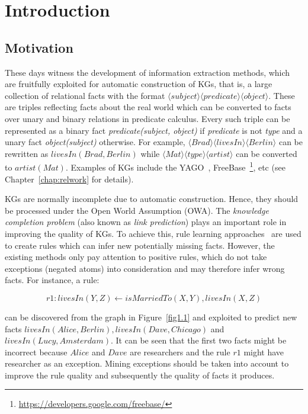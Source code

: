 \chapter{Introduction}
\label{chap:intro}

\section{Motivation}
\label{chap:motivation}

These days witness the development of information extraction methods, which are fruitfully exploited for automatic construction of KGs, that is, a large collection of relational facts with the format $\langle subject \rangle \langle predicate \rangle \langle object \rangle$. These are triples reflecting facts about the real world which can be converted to facts over unary and binary relations in predicate calculus. Every such triple can be represented as a binary fact \textit{predicate(subject, object)} if \textit{predicate} is not \textit{type} and a unary fact \textit{object(subject)} otherwise. For example, $\langle Brad \rangle \langle livesIn \rangle \langle Berlin \rangle$ can be rewritten as $livesIn(Brad, Berlin)$ while $\langle Mat \rangle \langle type \rangle \langle artist \rangle$ can be converted to $artist(Mat)$. Examples of KGs include the YAGO~\cite{ref28}, FreeBase~\footnote{\url{https://developers.google.com/freebase/}}, etc (see Chapter~\ref{chap:relwork} for details).

KGs are normally incomplete due to automatic construction. Hence, they should be processed under the Open World Assumption (OWA). The \textit{knowledge completion problem} (also known as \textit{link prediction}) plays an important role in improving the quality of KGs. To achieve this, rule learning approaches~\cite{ref39, ref10} are used to create rules which can infer new potentially missing facts. However, the existing methods only pay attention to positive rules, which do not take exceptions (negated atoms) into consideration and may therefore infer wrong facts. For instance, a rule:

\begin{equation}
r1: livesIn(Y,Z) \leftarrow isMarriedTo(X,Y), livesIn(X,Z)
\end{equation}
\label{rule1}

can be discovered from the graph in Figure~\ref{fig1.1} and exploited to predict new facts $livesIn(Alice, Berlin), livesIn(Dave, Chicago)$ and $livesIn(Lucy, Amsterdam)$. It can be seen that the first two facts might be incorrect because $Alice$ and $Dave$ are researchers and the rule $r1$ might have researcher as an exception. Mining exceptions should be taken into account to improve the rule quality and subsequently the quality of facts it produces.

